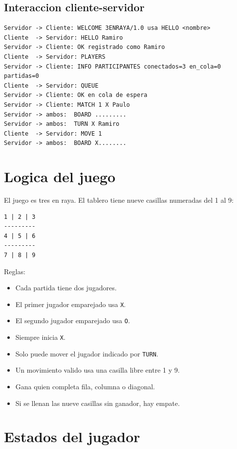 \documentclass[12pt,a4paper]{article}
\begin{document}
\subsection{Interaccion cliente-servidor}

\begin{lstlisting}[style=code]
Servidor -> Cliente: WELCOME 3ENRAYA/1.0 usa HELLO <nombre>
Cliente  -> Servidor: HELLO Ramiro
Servidor -> Cliente: OK registrado como Ramiro
Cliente  -> Servidor: PLAYERS
Servidor -> Cliente: INFO PARTICIPANTES conectados=3 en_cola=0 partidas=0
Cliente  -> Servidor: QUEUE
Servidor -> Cliente: OK en cola de espera
Servidor -> Cliente: MATCH 1 X Paulo
Servidor -> ambos:  BOARD .........
Servidor -> ambos:  TURN X Ramiro
Cliente  -> Servidor: MOVE 1
Servidor -> ambos:  BOARD X........
\end{lstlisting}

\section{Logica del juego}

El juego es tres en raya. El tablero tiene nueve casillas numeradas del 1 al 9:

\begin{lstlisting}[style=code]
1 | 2 | 3
---------
4 | 5 | 6
---------
7 | 8 | 9
\end{lstlisting}

Reglas:

\begin{itemize}
    \item Cada partida tiene dos jugadores.
    \item El primer jugador emparejado usa \texttt{X}.
    \item El segundo jugador emparejado usa \texttt{O}.
    \item Siempre inicia \texttt{X}.
    \item Solo puede mover el jugador indicado por \texttt{TURN}.
    \item Un movimiento valido usa una casilla libre entre 1 y 9.
    \item Gana quien completa fila, columna o diagonal.
    \item Si se llenan las nueve casillas sin ganador, hay empate.
\end{itemize}

\section{Estados del jugador}
\end{document}
